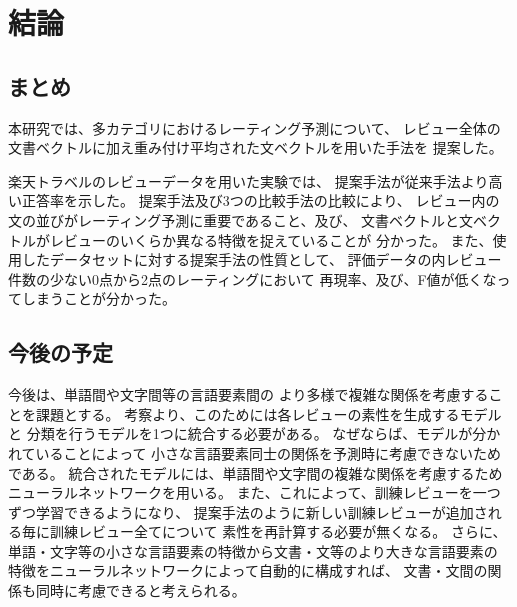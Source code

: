 \section{結論} \label{sec:Conclusion}

\subsection{まとめ}

本研究では、多カテゴリにおけるレーティング予測について、
レビュー全体の文書ベクトルに加え重み付け平均された文ベクトルを用いた手法を
提案した。

楽天トラベルのレビューデータを用いた実験では、
提案手法が従来手法\cite{fujitani15}より高い正答率を示した。
提案手法及び3つの比較手法の比較により、
レビュー内の文の並びがレーティング予測に重要であること、及び、
文書ベクトルと文ベクトルがレビューのいくらか異なる特徴を捉えていることが
分かった。
また、使用したデータセットに対する提案手法の性質として、
評価データの内レビュー件数の少ない0点から2点のレーティングにおいて
再現率、及び、F値が低くなってしまうことが分かった。


\subsection{今後の予定}

今後は、単語間や文字間等の言語要素間の
より多様で複雑な関係を考慮することを課題とする。
考察より、このためには各レビューの素性を生成するモデルと
分類を行うモデルを1つに統合する必要がある。
なぜならば、モデルが分かれていることによって
小さな言語要素同士の関係を予測時に考慮できないためである。
統合されたモデルには、単語間や文字間の複雑な関係を考慮するため
ニューラルネットワークを用いる。
また、これによって、訓練レビューを一つずつ学習できるようになり、
提案手法のように新しい訓練レビューが追加される毎に訓練レビュー全てについて
素性を再計算する必要が無くなる。
さらに、単語・文字等の小さな言語要素の特徴から文書・文等のより大きな言語要素の
特徴をニューラルネットワークによって自動的に構成すれば、
文書・文間の関係も同時に考慮できると考えられる。
